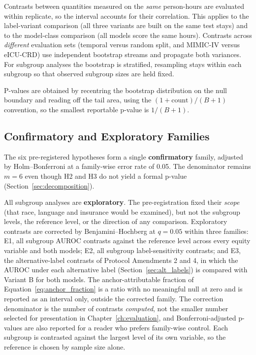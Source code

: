 Contrasts between quantities measured on the \emph{same} person-hours are
evaluated within replicate, so the interval accounts for their correlation.
This applies to the label-variant comparison (all three variants are built on
the same test stays) and to the model-class comparison (all models score the
same hours). Contrasts across \emph{different} evaluation sets (temporal
versus random split, and MIMIC-IV versus eICU-CRD) use independent bootstrap
streams and propagate both variances. For subgroup analyses the bootstrap is
stratified, resampling stays within each subgroup so that observed subgroup
sizes are held fixed.

P-values are obtained by recentring the bootstrap distribution on the null
boundary and reading off the tail area, using the $(1 + \text{count})/(B + 1)$
convention, so the smallest reportable p-value is $1/(B+1)$.

\subsection{Confirmatory and Exploratory Families}

The six pre-registered hypotheses form a single \textbf{confirmatory} family,
adjusted by Holm--Bonferroni at a family-wise error rate of 0.05. The
denominator remains $m = 6$ even though H2 and H3 do not yield a formal
p-value (Section~\ref{sec:decomposition}).

All subgroup analyses are \textbf{exploratory}. The pre-registration fixed
their \emph{scope} (that race, language and insurance would be examined),
but not the subgroup levels, the reference level, or the direction of any
comparison. Exploratory contrasts are corrected by Benjamini--Hochberg at
$q = 0.05$ within three families: E1, all subgroup AUROC contrasts against the
reference level across every equity variable and both models; E2, all subgroup
label-sensitivity contrasts; and E3, the alternative-label contrasts of
Protocol Amendments 2 and 4, in which the AUROC under each alternative label
(Section~\ref{sec:alt_labels}) is compared with Variant B for both models. The
anchor-attributable fraction of Equation~\ref{eq:anchor_fraction} is a ratio
with no meaningful null at zero and is reported as an interval only, outside
the corrected family. The correction denominator is the number of contrasts
\emph{computed}, not the smaller number selected for presentation in
Chapter~\ref{ch:evaluation}, and Bonferroni-adjusted p-values are also reported
for a reader who prefers family-wise control. Each subgroup is contrasted
against the largest level of its own variable, so the reference is chosen by
sample size alone.

